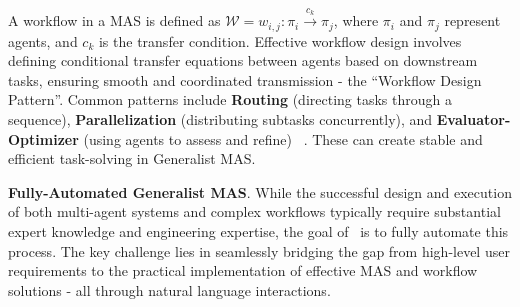 A workflow in a MAS is defined as $\mathcal{W} = {w_{i,j}: \pi_i \xrightarrow{c_k} \pi_j}$, where $\pi_i$ and $\pi_j$ represent agents, and $c_k$ is the transfer condition. Effective workflow design involves defining conditional transfer equations between agents based on downstream tasks, ensuring smooth and coordinated transmission - the ``Workflow Design Pattern''. Common patterns include \textbf{Routing} (directing tasks through a sequence), \textbf{Parallelization} (distributing subtasks concurrently), and \textbf{Evaluator-Optimizer} (using agents to assess and refine) ~\cite{anthropic2023effectiveagents}. These can create stable and efficient task-solving in Generalist MAS.

\noindent \textbf{Fully-Automated Generalist MAS}. While the successful design and execution of both multi-agent systems and complex workflows typically require substantial expert knowledge and engineering expertise, the goal of \model\ is to fully automate this process. The key challenge lies in seamlessly bridging the gap from high-level user requirements to the practical implementation of effective MAS and workflow solutions - all through natural language interactions.